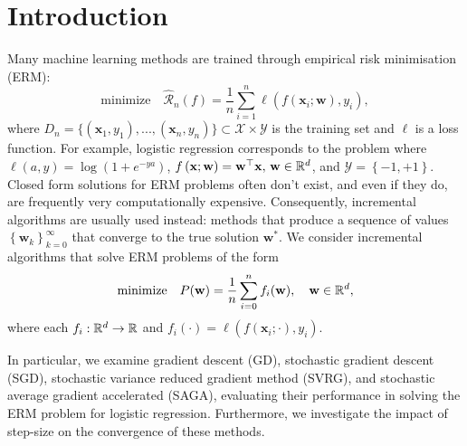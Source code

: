 \section{Introduction}

Many machine learning methods are trained through empirical risk minimisation (ERM):
\begin{equation}\label{Empirical Risk}
    \text{minimize} \quad \hat{\mathcal{R}}_n(f) = \frac{1}{n}\sum_{i=1}^{n}\ell(f(\mathbf{x}_i; \mathbf{w}), y_i),
\end{equation}
where $D_n = \{(\mathbf{x}_1, y_1),...,(\mathbf{x}_n, y_n)\} \subset \mathcal{X} \times \mathcal{Y}$ is the training set and $\ell$ is a loss function. For example, logistic regression corresponds to the problem where $\ell\left(a,y\right) = \log\left(1+e^{-ya}\right)$, $f\left(\mathbf{x}; \mathbf{w}\right) = \mathbf{w}^\top \mathbf{x}, \, \mathbf{w} \in \mathbb{R}^d$, and $\mathcal{Y} = \left\{-1, +1\right\}$. Closed form solutions for ERM problems often don't exist, and even if they do, are frequently very computationally expensive. Consequently, incremental algorithms are usually used instead: methods that produce a sequence of values $\left\{\mathbf{w}_k\right\}_{k = 0}^\infty$ that converge to the true solution $\mathbf{w}^*$. We consider incremental algorithms that solve ERM problems of the form
\begin{equation}\label{GeneralProb}
   \text{minimize} \quad P(\mathbf{w}) = \frac{1}{n} \sum_{i = 0}^n f_i(\mathbf{w}), \quad \mathbf{w} \in \mathbb{R}^d,
\end{equation}
where each $f_i : \mathbb{R}^d \to \mathbb{R}$ and $f_i\left(\cdot\right) = \ell\left(f\left(\mathbf{x}_i;\cdot\right),y_i\right)$.

In particular, we examine gradient descent (GD), stochastic gradient descent (SGD), stochastic variance reduced gradient method (SVRG), and stochastic average gradient accelerated (SAGA), evaluating their performance in solving the ERM problem for logistic regression. Furthermore, we investigate the impact of step-size on the convergence of these methods.